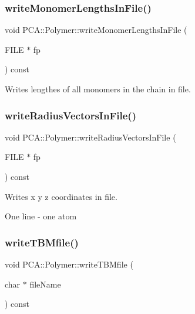 \hypertarget{class_p_c_a_1_1_polymer_a081b8e4d7cac0da6cc411c7b56ff7362}{}\label{class_p_c_a_1_1_polymer_a081b8e4d7cac0da6cc411c7b56ff7362} 
\subsubsection{\texorpdfstring{write\+Monomer\+Lengths\+In\+File()}{writeMonomerLengthsInFile()}}
{\footnotesize\ttfamily void P\+C\+A\+::\+Polymer\+::write\+Monomer\+Lengths\+In\+File (\begin{DoxyParamCaption}\item[{F\+I\+LE $\ast$}]{fp }\end{DoxyParamCaption}) const}



Writes lengthes of all monomers in the chain in file. 

\hypertarget{class_p_c_a_1_1_polymer_a9859e587476da47e49cfee1152e93fa0}{}\label{class_p_c_a_1_1_polymer_a9859e587476da47e49cfee1152e93fa0} 
\subsubsection{\texorpdfstring{write\+Radius\+Vectors\+In\+File()}{writeRadiusVectorsInFile()}}
{\footnotesize\ttfamily void P\+C\+A\+::\+Polymer\+::write\+Radius\+Vectors\+In\+File (\begin{DoxyParamCaption}\item[{F\+I\+LE $\ast$}]{fp }\end{DoxyParamCaption}) const}



Writes x y z coordinates in file. 

One line -\/ one atom \hypertarget{class_p_c_a_1_1_polymer_ac89188a3e56684ff3313a43ff83abea0}{}\label{class_p_c_a_1_1_polymer_ac89188a3e56684ff3313a43ff83abea0} 
\subsubsection{\texorpdfstring{write\+T\+B\+Mfile()}{writeTBMfile()}}
{\footnotesize\ttfamily void P\+C\+A\+::\+Polymer\+::write\+T\+B\+Mfile (\begin{DoxyParamCaption}\item[{char $\ast$}]{file\+Name }\end{DoxyParamCaption}) const}



